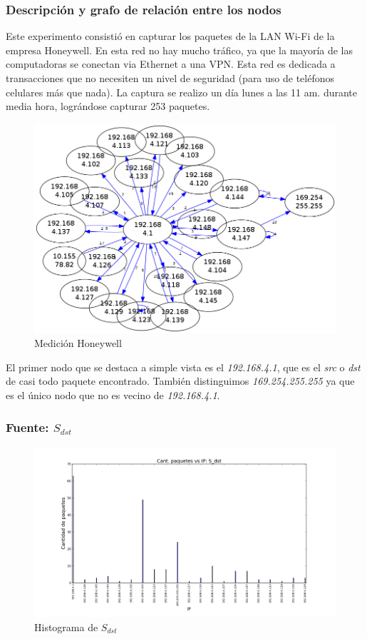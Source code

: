 \subsubsection{Descripción y grafo de relación entre los nodos}

Este experimento consistió en capturar los paquetes de la LAN Wi-Fi de la empresa Honeywell. En esta red no hay mucho tráfico, ya que la mayoría de las computadoras se conectan via Ethernet a una VPN. Esta red es dedicada a transacciones que no necesiten un nivel de seguridad (para uso de teléfonos celulares más que nada). La captura se realizo un día lunes a las 11 am. durante media hora, lográndose capturar 253 paquetes.  

\begin{figure}[H]
 \begin{center}
  \includegraphics[width=0.7\linewidth]{../imgs/red-honeywell_red.png}
  \caption{Medición Honeywell}
 \end{center}
\end{figure}

El primer nodo que se destaca a simple vista es el \emph{192.168.4.1}, que es el \emph{src} o \emph{dst} de casi todo paquete encontrado.
También distinguimos \emph{169.254.255.255} ya que es el único nodo que no es vecino de \emph{192.168.4.1}.

\subsubsection{Fuente: $S_{dst}$}

\begin{figure}[H]\centering
    \includegraphics[width=0.8\linewidth]{../imgs/red-honeywell_S_dst_hist.png}
    \caption{Histograma de $S_{dst}$}\label{fig:Honeywell-dst-hist}
\end{figure}

